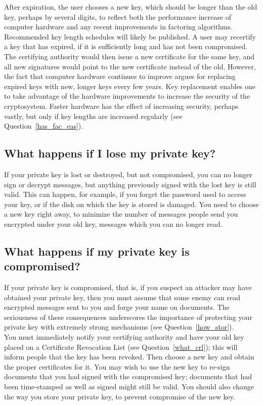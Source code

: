 After expiration, the user chooses a new key, which should be longer
than the old key, perhaps by several digits, to reflect both the
performance increase of computer hardware and any recent improvements
in factoring algorithms. Recommended key length schedules will likely
be published. A user may recertify a key that has expired, if it is
sufficiently long and has not been compromised. The certifying
authority would then issue a new certificate for the same key, and all
new signatures would point to the new certificate instead of the old.
However, the fact that computer hardware continues to improve argues
for replacing expired keys with new, longer keys every few years. Key
replacement enables one to take advantage of the hardware improvements
to increase the security of the cryptosystem. Faster hardware has the
effect of increasing security, perhaps vastly, but only if key lengths
are increased regularly (see Question~\ref{has_fac_eas}).

\subsection{What happens if I lose my private key?}

If your private key is lost or destroyed, but not compromised, you can
no longer sign or decrypt messages, but anything previously signed with
the lost key is still valid. This can happen, for example, if you
forget the password used to access your key, or if the disk on which
the key is stored is damaged. You need to choose a new key right away,
to minimize the number of messages people send you encrypted under your
old key, messages which you can no longer read.

\subsection{What happens if my private key is compromised?}

If your private key is compromised, that is, if you suspect an attacker
may have obtained your private key, then you must assume that some
enemy can read encrypted messages sent to you and forge your name on
documents. The seriousness of these consequences underscores the
importance of protecting your private key with extremely strong
mechanisms (see Question~\ref{how_stor}).\\

You must immediately notify your certifying authority and have your old key
placed on a Certificate Revocation List (see Question~\ref{what_crl}); this
will inform people that the key has been revoked. Then choose a new key and
obtain the proper certificates for it. You may wish to use the new key to
re-sign documents that you had signed with the compromised key; documents
that had been time-stamped as well as signed might still be valid. You
should also change the way you store your private key, to prevent
compromise of the new key.

